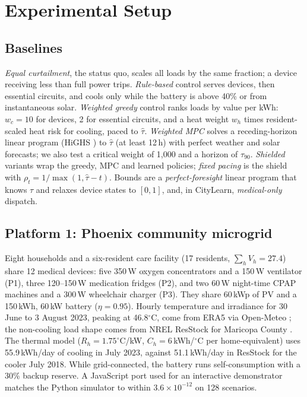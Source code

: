 \documentclass[conference]{IEEEtran}
\begin{document}
\section{Experimental Setup}
\subsection{Baselines}
\emph{Equal curtailment}, the status quo, scales all loads by the same fraction; a device receiving less than full power trips. \emph{Rule-based} control serves devices, then essential circuits, and cools only while the battery is above 40\% or from instantaneous solar. \emph{Weighted greedy} control ranks loads by value per kWh: $w_c=10$ for devices, 2 for essential circuits, and a heat weight $w_h$ times resident-scaled heat risk for cooling, paced to $\hat\tau$. \emph{Weighted MPC} solves a receding-horizon linear program (HiGHS \cite{huangfu2018highs}) to $\hat\tau$ (at least 12\,h) with perfect weather and solar forecasts; we also test a critical weight of 1,000 and a horizon of $\tau_{90}$. \emph{Shielded} variants wrap the greedy, MPC and learned policies; \emph{fixed pacing} is the shield with $\rho_t=1/\max(1,\hat\tau-t)$. Bounds are a \emph{perfect-foresight} linear program that knows $\tau$ and relaxes device states to $[0,1]$, and, in CityLearn, \emph{medical-only} dispatch.

\subsection{Platform 1: Phoenix community microgrid}
Eight households and a six-resident care facility (17 residents, $\sum_h V_h=27.4$) share 12 medical devices: five 350\,W oxygen concentrators and a 150\,W ventilator (P1), three 120--150\,W medication fridges (P2), and two 60\,W night-time CPAP machines and a 300\,W wheelchair charger (P3). They share 60\,kWp of PV and a 150\,kWh, 60\,kW battery ($\eta=0.95$). Hourly temperature and irradiance for 30 June to 3 August 2023, peaking at 46.8$^\circ$C, come from ERA5 \cite{hersbach2020era5} via Open-Meteo \cite{zippenfenig2023openmeteo}; the non-cooling load shape comes from NREL ResStock for Maricopa County \cite{wilson2022eulp}. The thermal model ($R_h=1.75^\circ$C/kW, $C_h=6$\,kWh/$^\circ$C per home-equivalent) uses 55.9\,kWh/day of cooling in July 2023, against 51.1\,kWh/day in ResStock for the cooler July 2018. While grid-connected, the battery runs self-consumption with a 30\% backup reserve. A JavaScript port used for an interactive demonstrator matches the Python simulator to within $3.6\times10^{-12}$ on 128 scenarios.
\end{document}
